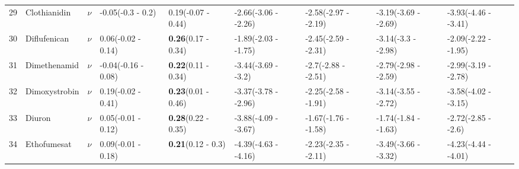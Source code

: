 \begin{longtable}{lp{2cm}p{0.6cm}p{1.8cm}p{1.8cm}p{1.8cm}p{1.8cm}p{1.8cm}p{1.8cm}}
  29 & Clothianidin & $\nu$ & -0.05\newline (-0.3 - 0.2) & 0.19\newline (-0.07 - 0.44) & -2.66\newline (-3.06 - -2.26) & -2.58\newline (-2.97 - -2.19) & -3.19\newline (-3.69 - -2.69) & -3.93\newline (-4.46 - -3.41) \\ 
  30 & Diflufenican & $\nu$ & 0.06\newline (-0.02 - 0.14) & \textbf{0.26}\newline (0.17 - 0.34) & -1.89\newline (-2.03 - -1.75) & -2.45\newline (-2.59 - -2.31) & -3.14\newline (-3.3 - -2.98) & -2.09\newline (-2.22 - -1.95) \\ 
  31 & Dimethenamid & $\nu$ & -0.04\newline (-0.16 - 0.08) & \textbf{0.22}\newline (0.11 - 0.34) & -3.44\newline (-3.69 - -3.2) & -2.7\newline (-2.88 - -2.51) & -2.79\newline (-2.98 - -2.59) & -2.99\newline (-3.19 - -2.78) \\ 
  32 & Dimoxystrobin & $\nu$ & 0.19\newline (-0.02 - 0.41) & \textbf{0.23}\newline (0.01 - 0.46) & -3.37\newline (-3.78 - -2.96) & -2.25\newline (-2.58 - -1.91) & -3.14\newline (-3.55 - -2.72) & -3.58\newline (-4.02 - -3.15) \\ 
  33 & Diuron & $\nu$ & 0.05\newline (-0.01 - 0.12) & \textbf{0.28}\newline (0.22 - 0.35) & -3.88\newline (-4.09 - -3.67) & -1.67\newline (-1.76 - -1.58) & -1.74\newline (-1.84 - -1.63) & -2.72\newline (-2.85 - -2.6) \\ 
  34 & Ethofumesat & $\nu$ & 0.09\newline (-0.01 - 0.18) & \textbf{0.21}\newline (0.12 - 0.3) & -4.39\newline (-4.63 - -4.16) & -2.23\newline (-2.35 - -2.11) & -3.49\newline (-3.66 - -3.32) & -4.23\newline (-4.44 - -4.01) \\ 

\end{longtable}
